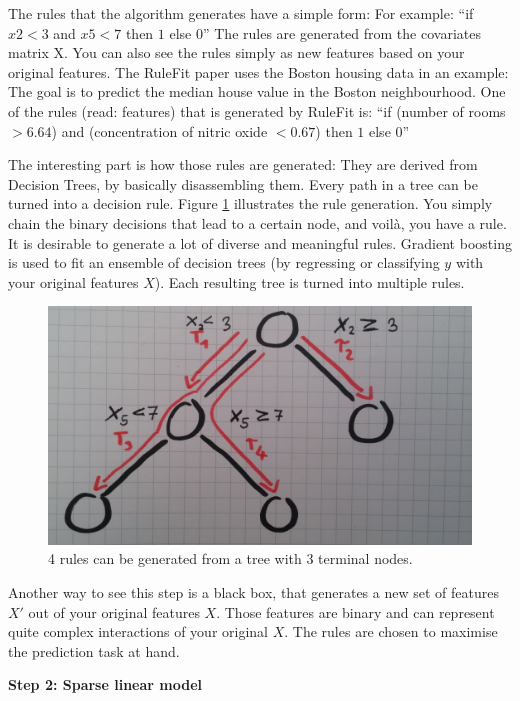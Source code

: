 \documentclass[12pt,]{krantz}
\theoremstyle{definition}
\theoremstyle{definition}
\theoremstyle{definition}
\theoremstyle{remark}
\begin{document}
The rules that the algorithm generates have a simple form: For example:
``if \(x2 < 3\) and \(x5 < 7\) then \(1\) else \(0\)'' The rules are
generated from the covariates matrix X. You can also see the rules
simply as new features based on your original features. The RuleFit
paper uses the Boston housing data in an example: The goal is to predict
the median house value in the Boston neighbourhood. One of the rules
(read: features) that is generated by RuleFit is: ``if (number of rooms
\(> 6.64\)) and (concentration of nitric oxide \(< 0.67\)) then \(1\)
else \(0\)''

The interesting part is how those rules are generated: They are derived
from Decision Trees, by basically disassembling them. Every path in a
tree can be turned into a decision rule. Figure \ref{fig:rulefit}
illustrates the rule generation. You simply chain the binary decisions
that lead to a certain node, and voilà, you have a rule. It is desirable
to generate a lot of diverse and meaningful rules. Gradient boosting is
used to fit an ensemble of decision trees (by regressing or classifying
\(y\) with your original features \(X\)). Each resulting tree is turned
into multiple rules.

\begin{figure}

{\centering \includegraphics[width=0.8\linewidth]{images/rulefit} 

}

\caption{4 rules can be generated from a tree with 3 terminal nodes.}\label{fig:rulefit}
\end{figure}

Another way to see this step is a black box, that generates a new set of
features \(X'\) out of your original features \(X\). Those features are
binary and can represent quite complex interactions of your original
\(X\). The rules are chosen to maximise the prediction task at hand.

\textbf{Step 2: Sparse linear model}
\end{document}
